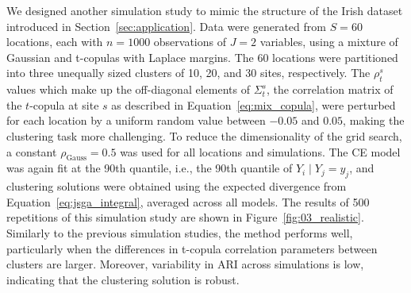 \documentclass[
  12pt]{article}
\newcommand{\JSGa}{\mathop{\mathrm{JS}^{\mathrm{G}_{\lambda}}}\nolimits}
\newcommand{\rhou}[1]{\rho_{\text{#1}}}
\begin{document}
We designed another simulation study to mimic the structure of the Irish dataset introduced in Section~\ref{sec:application}. 
Data were generated from $S = 60$ locations, each with $n = 1000$ observations of $J = 2$ variables, using a mixture of Gaussian and t-copulas with Laplace margins. 
The 60 locations were partitioned into three unequally sized clusters of 10, 20, and 30 sites, respectively. 
The $\rho_{t}^s$ values which make up the off-diagonal elements of $\Sigma_{t}^s$, the correlation matrix of the $t$-copula at site $s$ as described in Equation~\eqref{eq:mix_copula}, were perturbed for each location by a uniform random value between $-0.05$ and $0.05$, making the clustering task more challenging. 
To reduce the dimensionality of the grid search, a constant $\rhou{Gauss} = 0.5$ was used for all locations and simulations. 
The CE model was again fit at the 90th quantile, i.e., the 90th quantile of $Y_{i} \mid Y_{j} = y_j$, and clustering solutions were obtained using the expected divergence from Equation~\ref{eq:jsga_integral}, averaged across all models. 
The results of 500 repetitions of this simulation study are shown in Figure~\ref{fig:03_realistic}.
Similarly to the previous simulation studies, the method performs well, particularly when the differences in t-copula correlation parameters between clusters are larger. 
Moreover, variability in ARI across simulations is low, indicating that the clustering solution is robust. 
\end{document}
